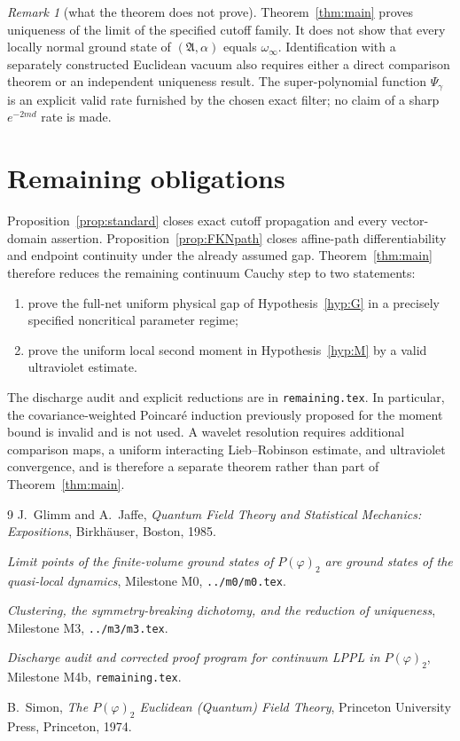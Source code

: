 \documentclass[11pt,a4paper]{article}
\theoremstyle{remark}
\newtheorem{remark}[theorem]{Remark}
\newcommand{\A}{\mathfrak A}
\begin{document}
\begin{remark}[what the theorem does not prove]\label{rem:limits}
Theorem~\ref{thm:main} proves uniqueness of the limit of the specified cutoff family.  It does not
show that every locally normal ground state of $(\A,\alpha)$ equals $\omega_\infty$.  Identification
with a separately constructed Euclidean vacuum also requires either a direct comparison theorem
or an independent uniqueness result.  The super-polynomial function $\Psi_\gamma$ is an explicit
valid rate furnished by the chosen exact filter; no claim of a sharp $e^{-2md}$ rate is made.
\end{remark}

\section{Remaining obligations}\label{sec:status}

Proposition~\ref{prop:standard} closes exact cutoff propagation and every vector-domain assertion.
Proposition~\ref{prop:FKNpath} closes affine-path differentiability and endpoint continuity under
the already assumed gap.  Theorem~\ref{thm:main} therefore reduces the remaining continuum Cauchy
step to two statements:
\begin{enumerate}
\item prove the full-net uniform physical gap of Hypothesis~\ref{hyp:G} in a precisely specified
      noncritical parameter regime;
\item prove the uniform local second moment in Hypothesis~\ref{hyp:M} by a valid ultraviolet
      estimate.
\end{enumerate}
The discharge audit and explicit reductions are in \texttt{remaining.tex}.  In particular, the
covariance-weighted Poincar\'e induction previously proposed for the moment bound is invalid and is
not used.  A wavelet
resolution requires additional comparison maps, a uniform interacting Lieb--Robinson estimate,
and ultraviolet convergence, and is therefore a separate theorem rather than part of
Theorem~\ref{thm:main}.

\begin{thebibliography}{9}
J.~Glimm and A.~Jaffe, \emph{Quantum Field Theory and Statistical Mechanics: Expositions},
Birkh\"auser, Boston, 1985.

\emph{Limit points of the finite-volume ground states of $P(\varphi)_2$ are ground states of the
quasi-local dynamics}, Milestone M0, \texttt{../m0/m0.tex}.

\emph{Clustering, the symmetry-breaking dichotomy, and the reduction of uniqueness},
Milestone M3, \texttt{../m3/m3.tex}.

\emph{Discharge audit and corrected proof program for continuum LPPL in $P(\varphi)_2$},
Milestone M4b, \texttt{remaining.tex}.

B.~Simon, \emph{The $P(\varphi)_2$ Euclidean (Quantum) Field Theory},
Princeton University Press, Princeton, 1974.
\end{thebibliography}
\end{document}
